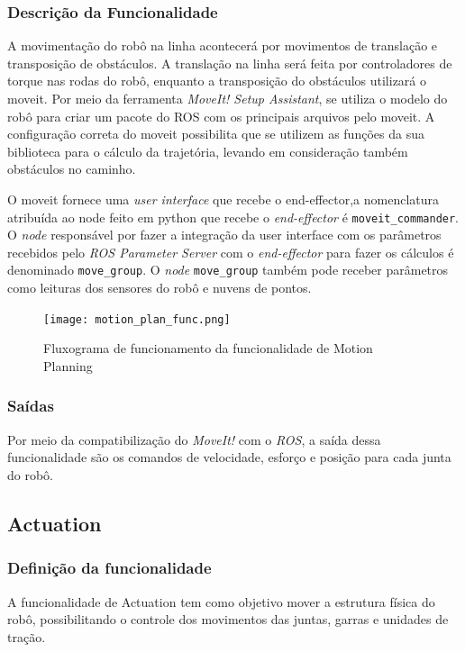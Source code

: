 \subsubsection{Descrição da Funcionalidade}
A movimentação do robô na linha acontecerá por movimentos de translação e transposição de obstáculos. A translação na linha será feita por controladores de torque nas rodas do robô, enquanto a transposição do obstáculos utilizará o moveit.
Por meio da ferramenta \textit{MoveIt! Setup Assistant}, se utiliza o modelo do robô para criar um pacote do ROS com os principais arquivos pelo moveit. 
A configuração correta do moveit possibilita que se utilizem as funções da sua biblioteca para o cálculo da trajetória, levando em consideração também obstáculos no caminho.

O moveit fornece uma \textit{user interface} que recebe o end-effector,a nomenclatura atribuída ao node feito em python que recebe o \textit{end-effector} é \verb|moveit_commander|. O  \textit{node} responsável por fazer a integração da user interface com os parâmetros recebidos pelo \textit{ROS Parameter Server} com o \textit{end-effector} para fazer os cálculos é denominado \verb|move_group|. O \textit{node} \verb|move_group| também pode receber parâmetros como leituras dos sensores do robô e nuvens de pontos.

\begin{figure}[!h]
	\centering
	\texttt{[image: motion\_plan\_func.png]}
	\caption{Fluxograma de funcionamento da funcionalidade de Motion Planning}
	\label{fig:flux_motion}
\end{figure}

\subsubsection{Saídas}
Por meio da compatibilização do \textit{MoveIt!} com o \textit{ROS}, a saída dessa funcionalidade são os comandos de velocidade, esforço e posição para cada junta do robô.

\subsection{Actuation }
\label{ssec:actu}
\subsubsection{Definição da funcionalidade}
A funcionalidade de Actuation tem como objetivo mover a estrutura física do robô, possibilitando o controle dos movimentos das juntas, garras e unidades de tração.
